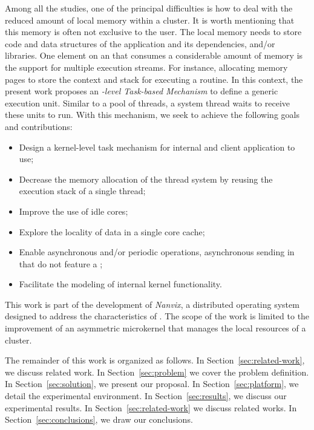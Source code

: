 	Among all the studies, one of the principal difficulties is how to deal
	with the reduced amount of local memory within a cluster. It is worth
	mentioning that this memory is often not exclusive to the user. The local
	memory needs to store code and data structures of the application and its
	dependencies, \eg \os and/or libraries. One element on an \os that consumes
	a considerable amount of memory is the support for multiple execution
	streams. For instance, allocating memory pages to store the context and
	stack for executing a routine.
	In this context, the present work proposes an \textit{\os-level Task-based
	Mechanism} to define a generic execution unit.  Similar to a pool of
	threads, a system thread waits to receive these units to run.
	With this mechanism, we seek to achieve the following goals
	and contributions:
	\begin{itemize}
		\item Design a kernel-level task mechanism for internal \os and client
			application to use;
		\item Decrease the memory allocation of the thread system by reusing
			the execution stack of a single thread;
		\item Improve the use of idle cores;
		\item Explore the locality of data in a single core cache;
		\item Enable asynchronous and/or periodic operations, \eg
			asynchronous sending in \lws that do not feature a \dma;
		\item Facilitate the modeling of internal kernel functionality.
	\end{itemize}
	This work is part of the development of \textit{Nanvix}, a distributed
	operating system designed to address the characteristics of \lws. The scope
	of the work is limited to the improvement of an asymmetric microkernel that
	manages the local resources of a cluster.

	The remainder of this work is organized as follows.
	In Section~\ref{sec:related-work}, we discuss related work.
	In Section~\ref{sec:problem} we cover the problem definition.
	In Section~\ref{sec:solution}, we present our proposal.
	In Section~\ref{sec:platform}, we detail the experimental environment.
	In Section~\ref{sec:results}, we discuss our experimental results.
	In Section~\ref{sec:related-work} we discuss related works.
	In Section~\ref{sec:conclusions}, we draw our conclusions.
